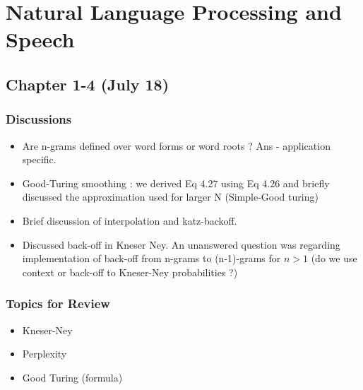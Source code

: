 \section{Natural Language Processing and Speech}

\subsection{Chapter 1-4 (July 18)}

\subsubsection*{Discussions}
\begin{itemize}
\item Are n-grams defined over word forms or word roots ? Ans - application specific.
\item Good-Turing smoothing : we derived Eq 4.27 using Eq 4.26 and briefly discussed the approximation used for larger N (Simple-Good turing)
\item Brief discussion of interpolation and katz-backoff.
\item Discussed back-off in Kneser Ney. An unanswered question was regarding implementation of back-off from n-grams to (n-1)-grams for $n > 1$ (do we use context or back-off to Kneser-Ney probabilities ?)
\end{itemize}

\subsubsection*{Topics for Review}
\begin{itemize}
\item Kneser-Ney
\item Perplexity
\item Good Turing (formula)
\end{itemize}